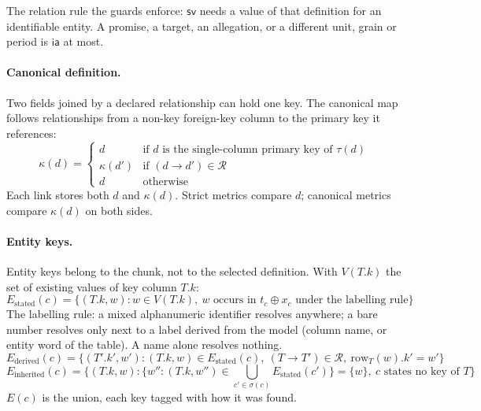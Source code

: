 \documentclass[11pt,a4paper]{article}
\newcommand{\sv}{\mathsf{sv}}
\newcommand{\ia}{\mathsf{ia}}
\begin{document}
The relation rule the guards enforce: $\sv$ needs a value of that definition for an identifiable entity. A promise, a target, an allegation, or a different unit, grain or period is $\ia$ at most.

\paragraph{Canonical definition.}
Two fields joined by a declared relationship can hold one key. The canonical map follows relationships from a non-key foreign-key column to the primary key it references:
\begin{equation}
\kappa(d) = \begin{cases}
d & \text{if } d \text{ is the single-column primary key of } \tau(d)\\
\kappa(d') & \text{if } (d \to d') \in \mathcal{R}\\
d & \text{otherwise}
\end{cases}
\end{equation}
Each link stores both $d$ and $\kappa(d)$. Strict metrics compare $d$; canonical metrics compare $\kappa(d)$ on both sides.

\paragraph{Entity keys.}
Entity keys belong to the chunk, not to the selected definition. With $V(T.k)$ the set of existing values of key column $T.k$:
\begin{equation}
E_{\mathrm{stated}}(c) = \{(T.k, w) : w \in V(T.k),\ w \text{ occurs in } t_c \oplus x_c \text{ under the labelling rule}\}
\end{equation}
The labelling rule: a mixed alphanumeric identifier resolves anywhere; a bare number resolves only next to a label derived from the model (column name, or entity word of the table). A name alone resolves nothing.
\begin{equation}
E_{\mathrm{derived}}(c) = \{(T'.k', w') : (T.k,w)\in E_{\mathrm{stated}}(c),\ (T \to T')\in\mathcal{R},\ \mathrm{row}_T(w).k' = w'\}
\end{equation}
\begin{equation}
E_{\mathrm{inherited}}(c) = \{(T.k, w) : \{w'' : (T.k,w'') \in \textstyle\bigcup_{c' \in \sigma(c)} E_{\mathrm{stated}}(c')\} = \{w\},\ c \text{ states no key of } T\}
\end{equation}
$E(c)$ is the union, each key tagged with how it was found.
\end{document}
